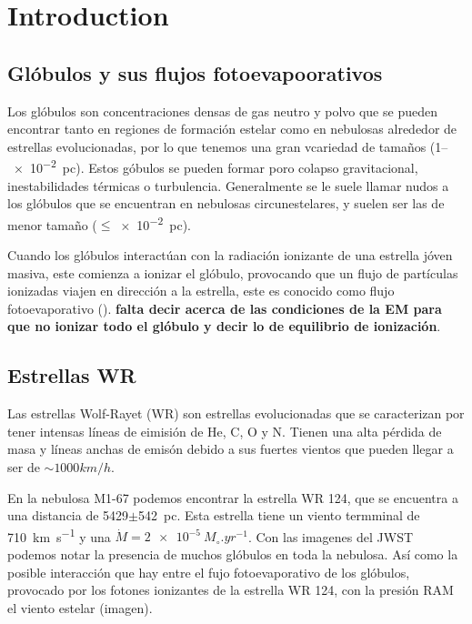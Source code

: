 \documentclass[twocolumn, times]{aastex631}
\begin{document}


\section{Introduction}
\label{sec:introduction}

\subsection{Glóbulos y sus flujos fotoevapoorativos}
Los glóbulos son concentraciones densas de gas neutro y polvo que se pueden encontrar tanto en regiones de formación estelar como en nebulosas alrededor de estrellas evolucionadas, por lo que tenemos una gran vcariedad de tamaños (1--\SI{e-2}{pc}). Estos góbulos se pueden formar poro colapso gravitacional, inestabilidades térmicas o turbulencia. Generalmente se le suele llamar nudos a los glóbulos que se encuentran en nebulosas circunestelares, y suelen ser las de menor tamaño ($\leq$\SI{e-2}{pc}).

Cuando los glóbulos interactúan con la radiación ionizante de una estrella jóven masiva, este comienza a ionizar el glóbulo, provocando que un flujo de partículas ionizadas viajen en dirección a la estrella, este es conocido como flujo fotoevaporativo (). \textbf{falta decir acerca de las condiciones de la EM para que no ionizar todo el glóbulo y decir lo de equilibrio de ionización}.

\subsection{Estrellas WR}

Las estrellas Wolf-Rayet (WR) son estrellas evolucionadas que se caracterizan por tener intensas líneas de eimisión de  He, C, O y N. Tienen una alta pérdida de masa y líneas anchas de emisón debido a sus fuertes vientos que pueden llegar a ser de $\sim 1000 km/h$.

En la nebulosa M1-67 podemos encontrar la estrella WR 124, que se encuentra a una distancia de 5429$\pm$\SI{542}{pc}. Esta estrella tiene un viento termminal de \SI{710}{km.s^{-1}} y una $\dot{M}=\SI{2e-5}{M_\circ.yr^{-1}}$. Con las imagenes del JWST podemos notar la presencia de muchos glóbulos en toda la nebulosa. Así como la posible interacción que hay entre el fujo fotoevaporativo de los glóbulos, provocado por los fotones ionizantes de la estrella WR 124, con la presión RAM el viento estelar (imagen). 
\end{document}
